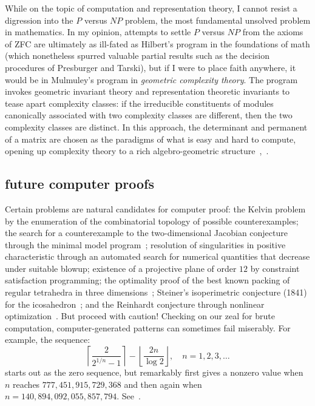 \documentclass{llncs}
\begin{document}



While on the topic of computation and representation theory, I cannot
resist a digression into the $P$ versus $NP$ problem, the most
fundamental unsolved problem in mathematics. In my opinion, attempts
to settle $P$ versus $NP$ from the axioms of ZFC are ultimately as
ill-fated as Hilbert's program in the foundations of math (which
nonetheless spurred valuable partial results such as the decision
procedures of Presburger and Tarski), but if I were to place faith
anywhere, it would be in Mulmuley's program in {\it geometric
  complexity theory}.  The program invokes geometric invariant theory
and representation theoretic invariants to tease apart complexity
classes: if the irreducible constituents of modules canonically
associated with two complexity classes are different, then the two
complexity classes are distinct.  In this approach, the determinant
and permanent of a matrix are chosen as the paradigms of what is easy
and hard to compute, opening up complexity theory to a rich
algebro-geometric structure~\cite{Mul11},~\cite{FPNP}.



\subsection{future computer proofs}

Certain problems are natural candidates for computer proof: the Kelvin
problem by the enumeration of the combinatorial topology of possible
counterexamples; the search for a counterexample to the
two-dimensional Jacobian conjecture through the minimal model
program~\cite{Borisov}; resolution of singularities in positive
characteristic through an automated search for numerical quantities
that decrease under suitable blowup; existence of a projective plane
of order $12$ by constraint satisfaction programming; the optimality
proof of the best known packing of regular tetrahedra in three
dimensions~\cite{Chen-2010}; Steiner's isoperimetric conjecture (1841) for the
icosahedron~\cite{Steiner41}; and the Reinhardt conjecture through
nonlinear optimization~\cite{HR11}.  But proceed with caution!
Checking on our zeal for brute computation, computer-generated
patterns can sometimes fail miserably.  For example, the 
sequence:
\[
\left\lceil{\frac{2}{2^{1/n} - 1}}\right\rceil- 
\left\lfloor{\frac{2 n}{\log 2}}\right\rfloor,\quad n=1,2,3,\ldots
\]
starts out as the zero sequence, but remarkably first gives a nonzero
value when $n$ reaches $777,451,915,729,368$ and then again when
$n=140,894,092,055,857,794$.  See~\cite{Stanley}.
\end{document}
